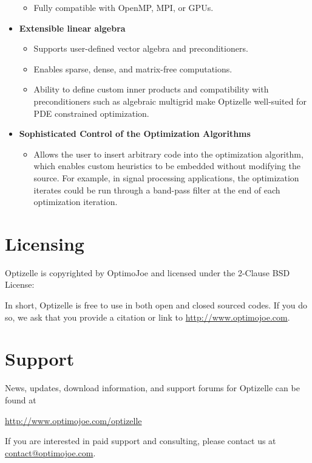 \documentclass{report}
\begin{document}
\begin{itemize}
        \begin{itemize}
            \item Fully compatible with OpenMP, MPI, or GPUs.
        \end{itemize}
    \item {\bf Extensible linear algebra}
        \begin{itemize}
            \item Supports user-defined vector algebra and preconditioners.
            \item Enables sparse, dense, and matrix-free computations.
            \item Ability to define custom inner products and compatibility with preconditioners such as algebraic multigrid make Optizelle well-suited for PDE constrained optimization.
        \end{itemize}
    \item {\bf Sophisticated Control of the Optimization Algorithms}
        \begin{itemize}
            \item Allows the user to insert arbitrary code into the optimization algorithm, which enables custom heuristics to be embedded without modifying the source.  For example, in signal processing applications, the optimization iterates could be run through a band-pass filter at the end of each optimization iteration.
        \end{itemize}
\end{itemize}

\section{Licensing}

        Optizelle is copyrighted by OptimoJoe and licensed under the 2-Clause BSD License:

In short, Optizelle is free to use in both open and closed sourced codes.  If you do so, we ask that you provide a citation or link to \url{http://www.optimojoe.com}.

\section{Support}
        
        News, updates, download information, and support forums for Optizelle can be found at
\begin{center}
    \mbox{\url{http://www.optimojoe.com/optizelle}}
\end{center}
If you are interested in paid support and consulting, please contact us at \mbox{\href{mailto:contact@optimojoe.com}{contact@optimojoe.com}}.
\end{document}
